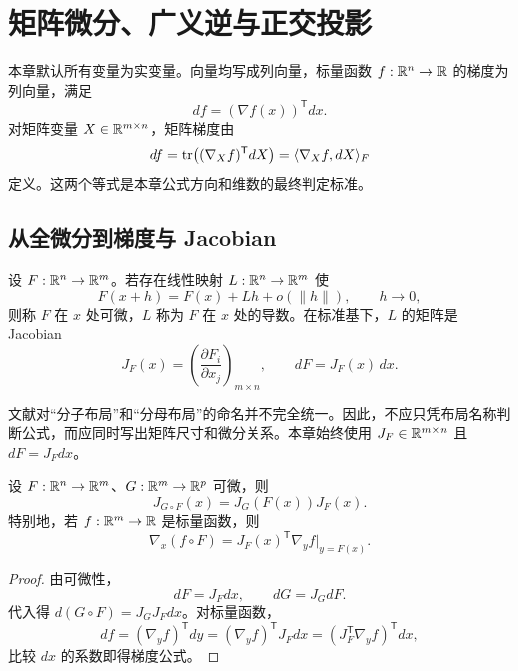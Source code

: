%
%

\chapter{矩阵微分、广义逆与正交投影}

本章默认所有变量为实变量。向量均写成列向量，标量函数 $f:\mathbb{R}^n\to\mathbb{R}$ 的梯度为列向量，满足
\[
df=(\nabla f(x))^{\mathsf T}dx.
\]
对矩阵变量 $X\in\mathbb{R}^{m\times n}$，矩阵梯度由
\[
df=\operatorname{tr}\!\left((\nabla_Xf)^{\mathsf T}dX\right)
=\langle\nabla_Xf,dX\rangle_F
\]
定义。这两个等式是本章公式方向和维数的最终判定标准。

\section{从全微分到梯度与 Jacobian}

\begin{definition}
设 $F:\mathbb{R}^n\to\mathbb{R}^m$。若存在线性映射 $L:\mathbb{R}^n\to\mathbb{R}^m$ 使
\[
F(x+h)=F(x)+Lh+o(\lVert h\rVert),
\qquad h\to0,
\]
则称 $F$ 在 $x$ 处可微，$L$ 称为 $F$ 在 $x$ 处的导数。在标准基下，$L$ 的矩阵是 Jacobian
\[
J_F(x)=\left(\frac{\partial F_i}{\partial x_j}\right)_{m\times n},
\qquad dF=J_F(x)\,dx.
\]
\end{definition}

文献对“分子布局”和“分母布局”的命名并不完全统一。因此，不应只凭布局名称判断公式，而应同时写出矩阵尺寸和微分关系。本章始终使用 $J_F\in\mathbb{R}^{m\times n}$ 且 $dF=J_Fdx$。

\begin{proposition}[链式法则]
设 $F:\mathbb{R}^n\to\mathbb{R}^m$、$G:\mathbb{R}^m\to\mathbb{R}^p$ 可微，则
\[
J_{G\circ F}(x)=J_G(F(x))J_F(x).
\]
特别地，若 $f:\mathbb{R}^m\to\mathbb{R}$ 是标量函数，则
\[
\nabla_x(f\circ F)=J_F(x)^{\mathsf T}\nabla_yf\big|_{y=F(x)}.
\]
\end{proposition}
\begin{proof}
由可微性，
\[
dF=J_Fdx,
\qquad
dG=J_GdF.
\]
代入得 $d(G\circ F)=J_GJ_Fdx$。对标量函数，
\[
df=(\nabla_yf)^{\mathsf T}dy
=(\nabla_yf)^{\mathsf T}J_Fdx
=(J_F^{\mathsf T}\nabla_yf)^{\mathsf T}dx,
\]
比较 $dx$ 的系数即得梯度公式。
\end{proof}

